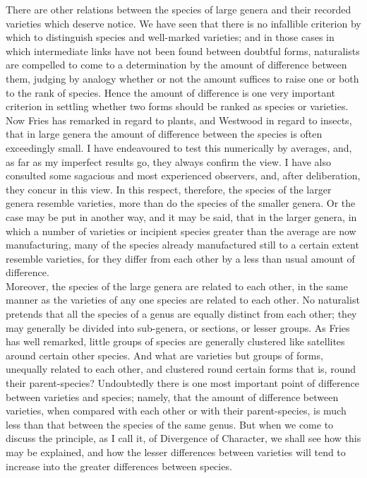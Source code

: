 \indent There are other relations between the species of large genera and their recorded varieties which deserve notice. We have seen that there is no infallible criterion by which to distinguish species and well-marked varieties; and in those cases in which intermediate links have not been found between doubtful forms, naturalists are compelled to come to a determination by the amount of difference between them, judging by analogy whether or not the amount suffices to raise one or both to the rank of species. Hence the amount of difference is one very important criterion in settling whether two forms should be ranked as species or varieties.  Now Fries has remarked in regard to plants, and Westwood in regard to insects, that in large genera the amount of difference between the species is often exceedingly small. I have endeavoured to test this numerically by averages, and, as far as my imperfect results go, they always confirm the view. I have also consulted some sagacious and most experienced observers, and, after deliberation, they concur in this view. In this respect, therefore, the species of the larger genera resemble varieties, more than do the species of the smaller genera. Or the case may be put in another way, and it may be said, that in the larger genera, in which a number of varieties or incipient species greater than the average are now manufacturing, many of the species already manufactured still to a certain extent resemble varieties, for they differ from each other by a less than usual amount of difference.\\
\indent Moreover, the species of the large genera are related to each other, in the same manner as the varieties of any one species are related to each other. No naturalist pretends that all the species of a genus are equally distinct from each other; they may generally be divided into sub-genera, or sections, or lesser groups.  As Fries has well remarked, little groups of species are generally clustered like satellites around certain other species. And what are varieties but groups of forms, unequally related to each other, and clustered round certain forms that is, round their parent-species? Undoubtedly there is one most important point of difference between varieties and species; namely, that the amount of difference between varieties, when compared with each other or with their parent-species, is much less than that between the species of the same genus. But when we come to discuss the principle, as I call it, of Divergence of Character, we shall see how this may be explained, and how the lesser differences between varieties will tend to increase into the greater differences between species. \\
